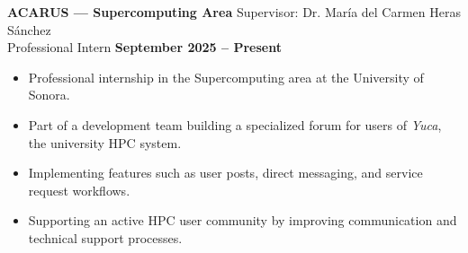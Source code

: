\documentclass[11pt]{article}
\begin{document}
\newpage
\vspace{0.2cm}
\textbf{ACARUS — Supercomputing Area} \hfill Supervisor: Dr. María del Carmen Heras Sánchez\\
Professional Intern \hfill \textbf{September 2025 -- Present}
\vspace{-0.3cm}
\begin{itemize}[leftmargin=*]
    \item Professional internship in the Supercomputing area at the University of Sonora.
    
    \vspace{-0.3cm}
    \item Part of a development team building a specialized forum for users of \textit{Yuca}, the university HPC system.
    
    \vspace{-0.3cm}
    \item Implementing features such as user posts, direct messaging, and service request workflows.
    
    \vspace{-0.3cm}
    \item Supporting an active HPC user community by improving communication and technical support processes.
\end{itemize}


\end{document}
